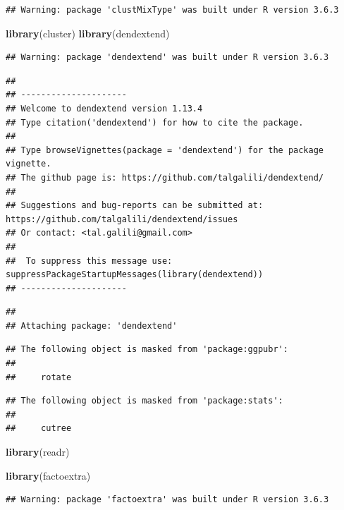 \documentclass[
]{article}
\newenvironment{Shaded}{\begin{snugshade}}{\end{snugshade}}
\newcommand{\KeywordTok}[1]{\textcolor[rgb]{0.13,0.29,0.53}{\textbf{#1}}}
\newcommand{\NormalTok}[1]{#1}
\begin{document}
\begin{verbatim}
## Warning: package 'clustMixType' was built under R version 3.6.3
\end{verbatim}

\begin{Shaded}
\begin{Highlighting}[]
\KeywordTok{library}\NormalTok{(cluster)}
\KeywordTok{library}\NormalTok{(dendextend) }
\end{Highlighting}
\end{Shaded}

\begin{verbatim}
## Warning: package 'dendextend' was built under R version 3.6.3
\end{verbatim}

\begin{verbatim}
## 
## ---------------------
## Welcome to dendextend version 1.13.4
## Type citation('dendextend') for how to cite the package.
## 
## Type browseVignettes(package = 'dendextend') for the package vignette.
## The github page is: https://github.com/talgalili/dendextend/
## 
## Suggestions and bug-reports can be submitted at: https://github.com/talgalili/dendextend/issues
## Or contact: <tal.galili@gmail.com>
## 
##  To suppress this message use:  suppressPackageStartupMessages(library(dendextend))
## ---------------------
\end{verbatim}

\begin{verbatim}
## 
## Attaching package: 'dendextend'
\end{verbatim}

\begin{verbatim}
## The following object is masked from 'package:ggpubr':
## 
##     rotate
\end{verbatim}

\begin{verbatim}
## The following object is masked from 'package:stats':
## 
##     cutree
\end{verbatim}

\begin{Shaded}
\begin{Highlighting}[]
\KeywordTok{library}\NormalTok{(readr)}

\KeywordTok{library}\NormalTok{(factoextra)}
\end{Highlighting}
\end{Shaded}

\begin{verbatim}
## Warning: package 'factoextra' was built under R version 3.6.3
\end{verbatim}
\end{document}
